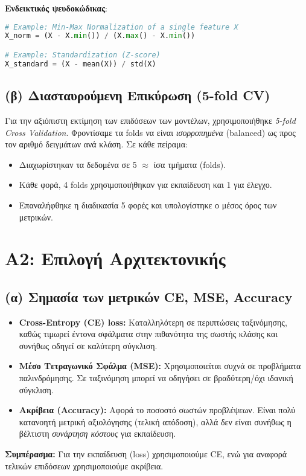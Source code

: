 \documentclass[a4paper,11pt]{article}
\begin{document}
\noindent
\textbf{Ενδεικτικός ψευδοκώδικας}:
\begin{lstlisting}[language=Python]
# Example: Min-Max Normalization of a single feature X
X_norm = (X - X.min()) / (X.max() - X.min())

# Example: Standardization (Z-score)
X_standard = (X - mean(X)) / std(X)
\end{lstlisting}

\subsection{(β) Διασταυρούμενη Επικύρωση (5-fold CV)}
Για την αξιόπιστη εκτίμηση των επιδόσεων των μοντέλων, χρησιμοποιήθηκε \emph{5-fold
Cross Validation}. Φροντίσαμε τα folds να είναι \emph{ισορροπημένα} (balanced) ως προς
τον αριθμό δειγμάτων ανά κλάση. Σε κάθε πείραμα:
\begin{itemize}
    \item Διαχωρίστηκαν τα δεδομένα σε 5 $\approx$ ίσα τμήματα (folds).
    \item Κάθε φορά, 4 folds χρησιμοποιήθηκαν για εκπαίδευση και 1 για έλεγχο.
    \item Επαναλήφθηκε η διαδικασία 5 φορές και υπολογίστηκε ο μέσος όρος των μετρικών.
\end{itemize}

\section{A2: Επιλογή Αρχιτεκτονικής}

\subsection{(α) Σημασία των μετρικών CE, MSE, Accuracy}
\begin{itemize}
  \item \textbf{Cross-Entropy (CE) loss:} Καταλληλότερη σε περιπτώσεις ταξινόμησης, καθώς τιμωρεί έντονα σφάλματα στην πιθανότητα της σωστής κλάσης και συνήθως οδηγεί σε καλύτερη σύγκλιση.
  \item \textbf{Μέσο Τετραγωνικό Σφάλμα (MSE):} Χρησιμοποιείται συχνά σε προβλήματα παλινδρόμησης. Σε ταξινόμηση μπορεί να οδηγήσει σε βραδύτερη/όχι ιδανική σύγκλιση.
  \item \textbf{Ακρίβεια (Accuracy):} Αφορά το ποσοστό σωστών προβλέψεων. Είναι πολύ κατανοητή μετρική αξιολόγησης (τελική απόδοση), αλλά δεν είναι συνήθως η βέλτιστη \emph{συνάρτηση κόστους} για εκπαίδευση.
\end{itemize}
\noindent
\textbf{Συμπέρασμα:} Για την εκπαίδευση (loss) χρησιμοποιούμε CE, ενώ για αναφορά
τελικών επιδόσεων χρησιμοποιούμε ακρίβεια.
\end{document}
